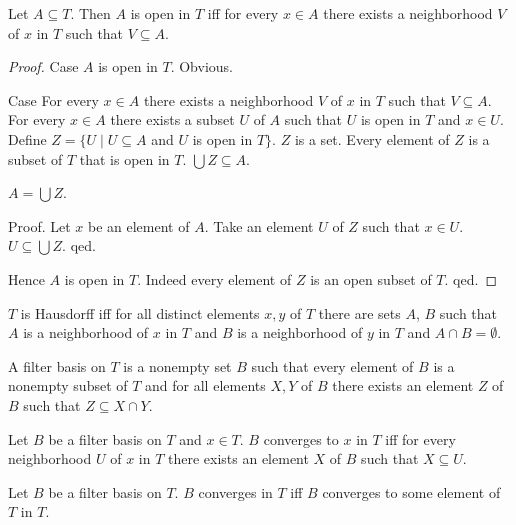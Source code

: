 \documentclass[english,11pt]{article}
\begin{document}
\begin{forthel}

\begin{lemma} Let $A \subseteq T$. Then $A$ is open in $T$ iff
for every $x \in A$ there exists a neighborhood $V$ of
$x$ in $T$ such that $V \subseteq A$.
\end{lemma}

\begin{proof}
Case $A$ is open in $T$. Obvious.

Case For every $x \in A$ there exists a neighborhood $V$ of
$x$ in $T$ such that $V \subseteq A$.
For every $x \in A$ there exists a subset $U$ of $A$ such
that $U$ is open in $T$ and $x \in U$.
Define $Z = \{U \mid U \subseteq A$ and $U$ is open in $T\}$.
$Z$ is a set.
Every element of $Z$ is a subset
of $T$ that is open in $T$.
$\bigcup Z \subseteq A$.

$A = \bigcup Z$. 

Proof. Let $x$ be an element of $A$. Take
an element $U$ of $Z$ such that
$x \in U$. $U \subseteq \bigcup Z$.
qed.

Hence $A$ is open in $T$. Indeed every element of $Z$ is an open subset of $T$.
qed.
\end{proof}

\begin{definition} $T$ is Hausdorff iff for all distinct elements
$x,y$ of $T$ 
there are sets $A$, $B$ such that $A$ is a neighborhood of $x$ in $T$ 
and $B$ is a neighborhood of $y$ in $T$ and
$A \cap B = \emptyset$.
\end{definition}

\begin{definition}
A filter basis on $T$ is a nonempty set $B$ such that
every element of $B$ is a nonempty subset of $T$ and
for all elements $X,Y$ of $B$ there exists an element $Z$ of $B$
such that  $Z \subseteq X \cap Y$.
\end{definition}

\begin{definition}
Let $B$ be a filter basis on $T$ and $x \in T$.
$B$ converges to $x$ in $T$ iff for every 
neighborhood $U$ of $x$ in $T$ 
there exists an element $X$ of $B$ such that $X \subseteq U$.
\end{definition}

\begin{definition}
Let $B$ be a filter basis on $T$.
$B$ converges in $T$ iff 
$B$ converges to some element of $T$ in $T$.
\end{definition}


\end{forthel}
\end{document}
